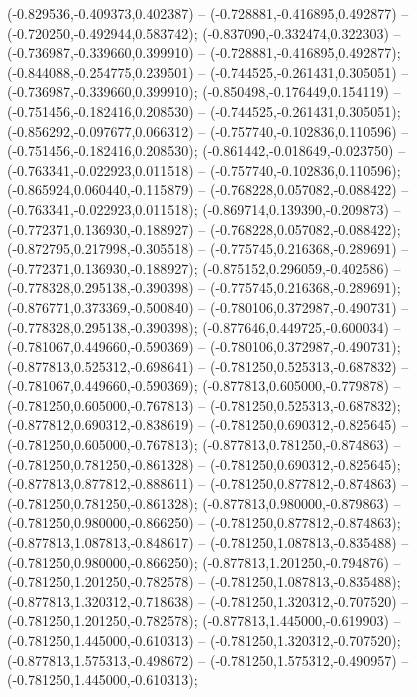 (-0.829536,-0.409373,0.402387) -- (-0.728881,-0.416895,0.492877) -- (-0.720250,-0.492944,0.583742);
 (-0.837090,-0.332474,0.322303) -- (-0.736987,-0.339660,0.399910) -- (-0.728881,-0.416895,0.492877);
 (-0.844088,-0.254775,0.239501) -- (-0.744525,-0.261431,0.305051) -- (-0.736987,-0.339660,0.399910);
 (-0.850498,-0.176449,0.154119) -- (-0.751456,-0.182416,0.208530) -- (-0.744525,-0.261431,0.305051);
 (-0.856292,-0.097677,0.066312) -- (-0.757740,-0.102836,0.110596) -- (-0.751456,-0.182416,0.208530);
 (-0.861442,-0.018649,-0.023750) -- (-0.763341,-0.022923,0.011518) -- (-0.757740,-0.102836,0.110596);
 (-0.865924,0.060440,-0.115879) -- (-0.768228,0.057082,-0.088422) -- (-0.763341,-0.022923,0.011518);
 (-0.869714,0.139390,-0.209873) -- (-0.772371,0.136930,-0.188927) -- (-0.768228,0.057082,-0.088422);
 (-0.872795,0.217998,-0.305518) -- (-0.775745,0.216368,-0.289691) -- (-0.772371,0.136930,-0.188927);
 (-0.875152,0.296059,-0.402586) -- (-0.778328,0.295138,-0.390398) -- (-0.775745,0.216368,-0.289691);
 (-0.876771,0.373369,-0.500840) -- (-0.780106,0.372987,-0.490731) -- (-0.778328,0.295138,-0.390398);
 (-0.877646,0.449725,-0.600034) -- (-0.781067,0.449660,-0.590369) -- (-0.780106,0.372987,-0.490731);
 (-0.877813,0.525312,-0.698641) -- (-0.781250,0.525313,-0.687832) -- (-0.781067,0.449660,-0.590369);
 (-0.877813,0.605000,-0.779878) -- (-0.781250,0.605000,-0.767813) -- (-0.781250,0.525313,-0.687832);
 (-0.877812,0.690312,-0.838619) -- (-0.781250,0.690312,-0.825645) -- (-0.781250,0.605000,-0.767813);
 (-0.877813,0.781250,-0.874863) -- (-0.781250,0.781250,-0.861328) -- (-0.781250,0.690312,-0.825645);
 (-0.877813,0.877812,-0.888611) -- (-0.781250,0.877812,-0.874863) -- (-0.781250,0.781250,-0.861328);
 (-0.877813,0.980000,-0.879863) -- (-0.781250,0.980000,-0.866250) -- (-0.781250,0.877812,-0.874863);
 (-0.877813,1.087813,-0.848617) -- (-0.781250,1.087813,-0.835488) -- (-0.781250,0.980000,-0.866250);
 (-0.877813,1.201250,-0.794876) -- (-0.781250,1.201250,-0.782578) -- (-0.781250,1.087813,-0.835488);
 (-0.877813,1.320312,-0.718638) -- (-0.781250,1.320312,-0.707520) -- (-0.781250,1.201250,-0.782578);
 (-0.877813,1.445000,-0.619903) -- (-0.781250,1.445000,-0.610313) -- (-0.781250,1.320312,-0.707520);
 (-0.877813,1.575313,-0.498672) -- (-0.781250,1.575312,-0.490957) -- (-0.781250,1.445000,-0.610313);
